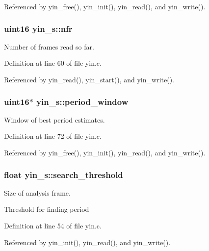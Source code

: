 Referenced by yin\+\_\+free(), yin\+\_\+init(), yin\+\_\+read(), and yin\+\_\+write().

\subsubsection[{nfr}]{\setlength{\rightskip}{0pt plus 5cm}uint16 yin\+\_\+s\+::nfr}\label{structyin__s_af4f11d14a36bbdc19863fa8335237423}


Number of frames read so far. 



Definition at line 60 of file yin.\+c.



Referenced by yin\+\_\+read(), yin\+\_\+start(), and yin\+\_\+write().

\subsubsection[{period\+\_\+window}]{\setlength{\rightskip}{0pt plus 5cm}uint16$\ast$ yin\+\_\+s\+::period\+\_\+window}\label{structyin__s_a1928cec127e250f6cd15249085bc9fc8}


Window of best period estimates. 



Definition at line 72 of file yin.\+c.



Referenced by yin\+\_\+free(), yin\+\_\+init(), yin\+\_\+read(), and yin\+\_\+write().

\subsubsection[{search\+\_\+threshold}]{\setlength{\rightskip}{0pt plus 5cm}float yin\+\_\+s\+::search\+\_\+threshold}\label{structyin__s_a48c5ec4512b28c565a6daee092dd87f3}


Size of analysis frame. 

Threshold for finding period 

Definition at line 54 of file yin.\+c.



Referenced by yin\+\_\+init(), yin\+\_\+read(), and yin\+\_\+write().

